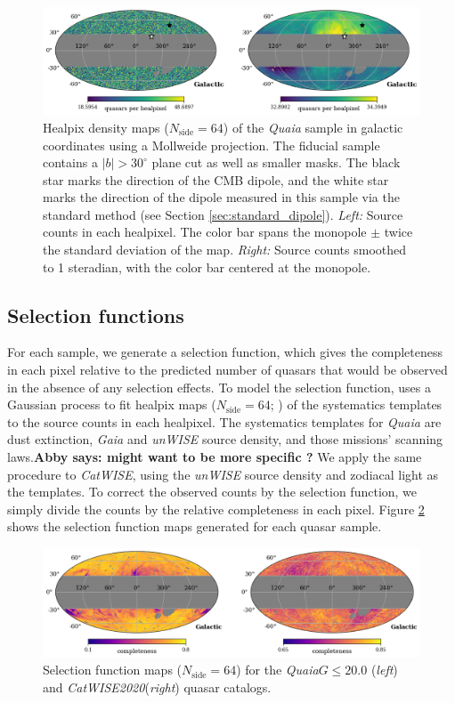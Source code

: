 \documentclass[modern]{aastex631}
\newcommand{\abby}[1]{\textbf{Abby says: #1}}
\newcommand{\catwise}{\textsl{CatWISE}\xspace}
\newcommand{\catwisetwentytwenty}{\textsl{CatWISE2020}\xspace}
\newcommand{\quaia}{\textsl{Quaia}\xspace}
\newcommand{\gaia}{\textsl{Gaia}\xspace}
\newcommand{\unwise}{\textsl{unWISE}\xspace}
\newcommand{\nside}{N_\mathrm{side}}
\begin{document}
\begin{figure}
    \centering
    \includegraphics[width=\textwidth]{images/quaia_map.png}
    \caption{Healpix density maps ($\nside=64$) of the \quaia sample in galactic coordinates using a Mollweide projection. The fiducial sample contains a $|b|>30^\circ$ plane cut as well as smaller masks. The black star marks the direction of the CMB dipole, and the white star marks the direction of the dipole measured in this sample via the standard method (see Section \ref{sec:standard_dipole}). \textit{Left:} Source counts in each healpixel. The color bar spans the monopole $\pm$ twice the standard deviation of the map. \textit{Right:} Source counts smoothed to 1 steradian, with the color bar centered at the monopole.}
    \label{fig:quaia_map}
\end{figure}


\subsection{Selection functions}
\label{sec:selfuncs}
For each sample, we generate a selection function, which gives the completeness in each pixel relative to the predicted number of quasars that would be observed in the absence of any selection effects.
To model the selection function, \cite{storey-fisher_quaia_2023} uses a Gaussian process to fit healpix maps ($\nside=64$; \citealt{gorski_healpix_2005}) of the systematics templates to the source counts in each healpixel.
The systematics templates for \quaia are dust extinction, \gaia and \unwise source density, and those missions' scanning laws.\abby{might want to be more specific ?}
We apply the same procedure to \catwise, using the \unwise source density and zodiacal light as the templates.
To correct the observed counts by the selection function, we simply divide the counts by the relative completeness in each pixel.
Figure \ref{fig:selfuncs} shows the selection function maps generated for each quasar sample.

\begin{figure}
    \centering
    \includegraphics[width=\textwidth]{images/selfuncs.png}
    \caption{Selection function maps ($\nside=64$) for the \quaia $G\le20.0$ (\textit{left}) and \catwisetwentytwenty (\textit{right}) quasar catalogs.}
    \label{fig:selfuncs}
\end{figure}
\end{document}
